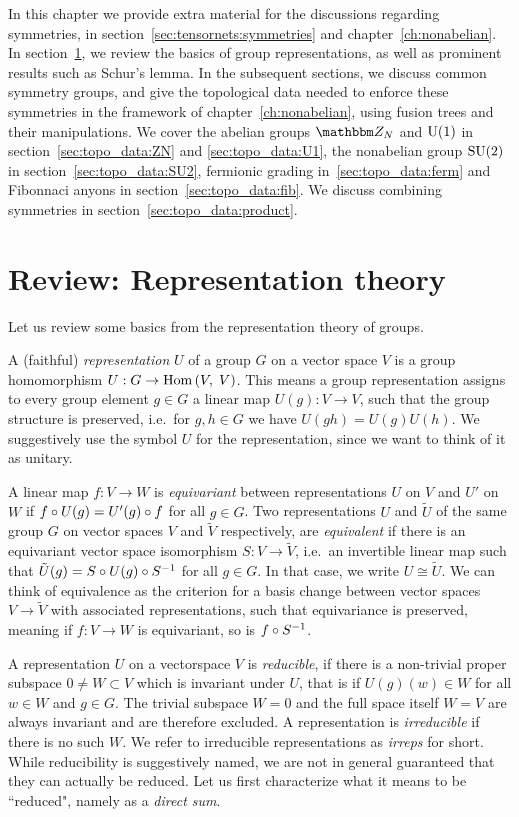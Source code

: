 In this chapter we provide extra material for the discussions regarding symmetries, in section~\ref{sec:tensornets:symmetries} and chapter~\ref{ch:nonabelian}.
%
In section~\ref{sec:topo_data:review_rep_thry}, we review the basics of group representations, as well as prominent results such as Schur's lemma.
%
In the subsequent sections, we discuss common symmetry groups, and give the topological data needed to enforce these symmetries in the framework of chapter~\ref{ch:nonabelian}, using fusion trees and their manipulations.
%
We cover the abelian groups $\Zbb_N$ and $\mathrm{U}(1)$ in section~\ref{sec:topo_data:ZN} and \ref{sec:topo_data:U1}, the nonabelian group $\mathrm{SU}(2)$ in section~\ref{sec:topo_data:SU2}, fermionic grading in~\ref{sec:topo_data:ferm} and Fibonnaci anyons in section~\ref{sec:topo_data:fib}.
%
We discuss combining symmetries in section~\ref{sec:topo_data:product}.


\section{Review: Representation theory}
\label{sec:topo_data:review_rep_thry}

Let us review some basics from the representation theory of groups.

A (faithful) \emph{representation} $U$ of a group $G$ on a vector space $V$ is a group homomorphism $U: G \to \mathrm{Hom}\left(V,\; V\right)$.
%
This means a group representation assigns to every group element $g\in G$ a linear map $U(g): V \to V$, such that the group structure is preserved, i.e.~for $g, h \in G$ we have $U(g h) = U(g) U(h)$.
%
We suggestively use the symbol $U$ for the representation, since we want to think of it as unitary.

A linear map $f: V \to W$ is \emph{equivariant} between representations $U$ on $V$ and $U'$ on $W$ if $f \circ U(g) = U'(g) \circ f$ for all $g\in G$.
%
Two representations $U$ and $\tilde{U}$ of the same group $G$ on vector spaces $V$ and $\tilde{V}$ respectively, are \emph{equivalent} if there is an equivariant vector space isomorphism $S: V \to \tilde{V}$, i.e.~an invertible linear map such that $\tilde{U}(g) = S \circ U(g) \circ S^{-1}$ for all $g\in G$.
%
In that case, we write $U \cong \tilde{U}$.
%
We can think of equivalence as the criterion for a basis change between vector spaces $V \to \tilde{V}$ with associated representations, such that equivariance is preserved, meaning if $f: V \to W$ is equivariant, so is $f \circ S^{-1}$.

A representation $U$ on a vectorspace $V$ is \emph{reducible}, if there is a non-trivial proper subspace $0 \neq W \subset V$ which is invariant under $U$, that is if $U(g)(w) \in W$ for all $w\in W$ and $g \in G$.
%
The trivial subspace $W = 0$ and the full space itself $W = V$ are always invariant and are therefore excluded.
%
A representation is \emph{irreducible} if there is no such $W$.
%
We refer to irreducible representations as \emph{irreps} for short.
%
While reducibility is suggestively named, we are not in general guaranteed that they can actually be reduced.
%
Let us first characterize what it means to be ``reduced", namely as a \emph{direct sum}.

